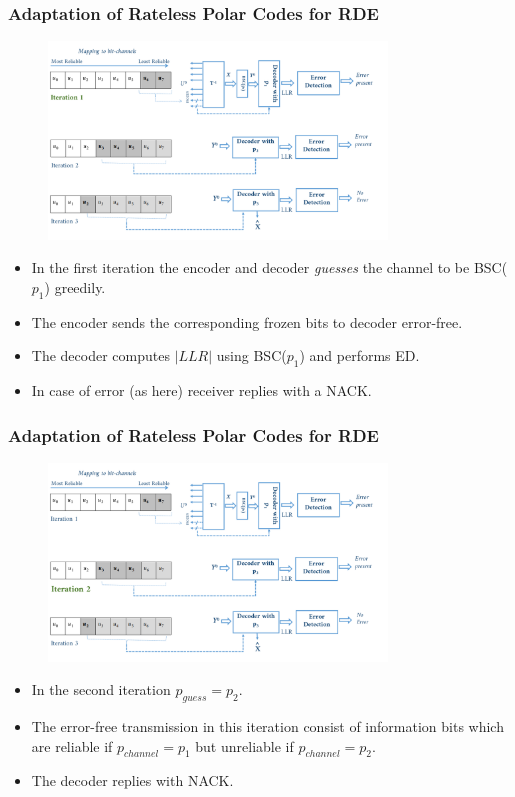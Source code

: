 \documentclass[xcolor=dvipsnames]{beamer}
\begin{document}
\begin{frame}[label=adapt1]
\frametitle{Adaptation of Rateless Polar Codes for RDE}
\begin{figure}[h]
 \begin{center}
    \includegraphics[width=9cm]{iswrpcp1.png}
  \end{center}
  \label{fig:iswrpc}
\end{figure} 
\begin{itemize}
\item In the first iteration the encoder and decoder \emph{guesses} the channel to be BSC($p_1$) greedily.
\item The encoder sends the corresponding frozen bits to decoder error-free.
\item The decoder computes $|LLR|$ using BSC($p_1$) and performs ED.
\item In case of error (as here) receiver replies with a NACK.
\end{itemize}
\end{frame}

\begin{frame}[label=adapt2]
\frametitle{Adaptation of Rateless Polar Codes for RDE}
\begin{figure}[h]
 \begin{center}
    \includegraphics[width=9cm]{iswrpcp2.png}
  \end{center}
  \label{fig:iswrpc}
\end{figure}
\begin{itemize}
\item In the second iteration $p_{guess}=p_2$.
\item The error-free transmission in this iteration consist of information bits which are reliable if $p_{channel}=p_1$ but unreliable if $p_{channel}=p_2$.
\item The decoder replies with NACK.
\end{itemize}
\end{frame}
\end{document}
